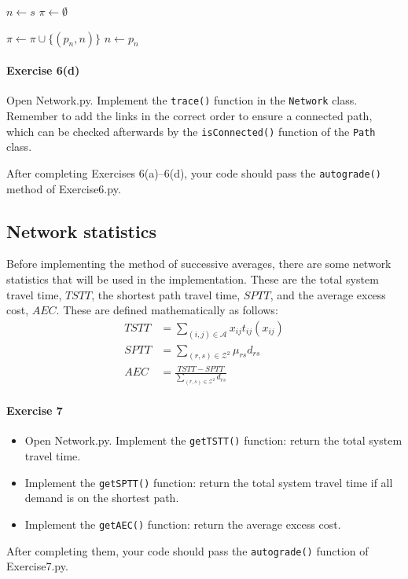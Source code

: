 \documentclass[11pt]{article}
\newcommand{\A}{\mathcal{A}}
\newcommand{\Z}{\mathcal{Z}}
\begin{document}
\vspace{\baselineskip}

\begin{algorithmic}[1]
	\State $n\leftarrow s$
	\State $\pi \leftarrow \emptyset$
	
	\vspace{0.5\baselineskip}
	
	\State $\pi\leftarrow \pi \cup \{(p_n,n)\}$
	\State $n\leftarrow p_n$
	\EndWhile
	\EndProcedure
\end{algorithmic}


\paragraph*{Exercise 6(d)} Open Network.py. Implement the \texttt{trace()} function in the \texttt{Network} class. 
Remember to add the links in the correct order to ensure a connected path, which can be checked afterwards by the \texttt{isConnected()} function of the \texttt{Path} class.

 \vspace{\baselineskip}


\noindent
After completing Exercises 6(a)--6(d), your code should pass the \texttt{autograde()} method of Exercise6.py. 


\subsection{Network statistics}

Before implementing the method of successive averages, there are some network statistics that will be used in the implementation. These are the total system travel time, $TSTT$, the shortest path travel time, $SPTT$, and the average excess cost, $AEC$. These are defined mathematically as follows:
\begin{align}
	TSTT &= \sum\limits_{(i,j)\in\A} x_{ij} t_{ij}(x_{ij})\\
	SPTT &= \sum\limits_{(r,s)\in\Z^2} \mu_{rs} d_{rs}\\
	AEC &= \frac{TSTT- SPTT}{\sum\limits_{(r,s)\in\Z^2} d_{rs}}
\end{align}

\paragraph*{Exercise 7} 
\begin{itemize}
	\item Open Network.py. Implement the \texttt{getTSTT()} function: return the total system travel time.
	\item Implement the \texttt{getSPTT()} function: return the total system travel time if all demand is on the shortest path. 
	
	\item Implement the \texttt{getAEC()} function: return the average excess cost. 
\end{itemize}
After completing them, your code should pass the \texttt{autograde()} function of Exercise7.py. 
\end{document}
